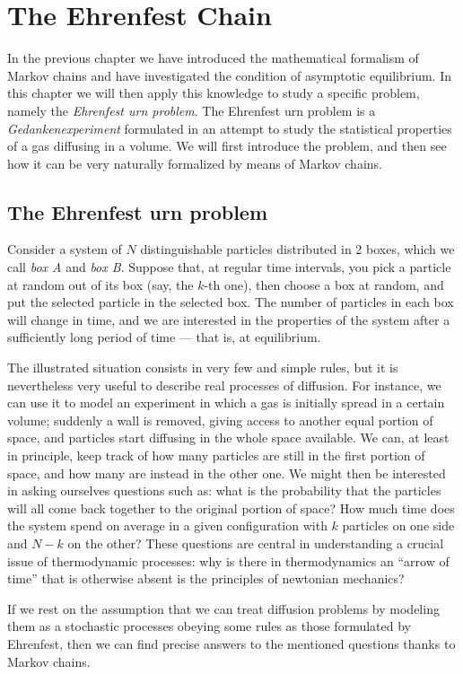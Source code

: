 \chapter{The Ehrenfest Chain}
In the previous chapter we have introduced the mathematical formalism of Markov chains and have investigated the condition of asymptotic equilibrium. In this chapter we will then apply this knowledge to study a specific problem, namely the \emph{Ehrenfest urn problem}. The Ehrenfest urn problem is a \emph{Gedankenexperiment} formulated in an attempt to study the statistical properties of a gas diffusing in a volume. We will first introduce the problem, and then see how it can be very naturally formalized by means of Markov chains.

\section{The Ehrenfest urn problem}
Consider a system of $N$ distinguishable particles distributed in 2 boxes, which we call \emph{box A} and \emph{box B}. Suppose that, at regular time intervals, you pick a particle at random out of its box (say, the $k$-th one), then choose a box at random, and put the selected particle in the selected box. The number of particles in each box will change in time, and we are interested in the properties of the system after a sufficiently long period of time --- that is, at equilibrium.

The illustrated situation consists in very few and simple rules, but it is nevertheless very useful to describe real processes of diffusion. For instance, we can use it to model an experiment in which a gas is initially spread in a certain volume; suddenly a wall is removed, giving access to another equal portion of space, and particles start diffusing in the whole space available. We can, at least in principle, keep track of how many particles are still in the first portion of space, and how many are instead in the other one. We might then be interested in asking ourselves questions such as: what is the probability that the particles will all come back together to the original portion of space? How much time does the system spend on average in a given configuration with $k$ particles on one side and $N - k$ on the other? These questions are central in understanding a crucial issue of thermodynamic processes: why is there in thermodynamics an \enquote{arrow of time} that is otherwise absent is the principles of newtonian mechanics?

If we rest on the assumption that we can treat diffusion problems by modeling them as a stochastic processes obeying some rules as those formulated by Ehrenfest, then we can find precise answers to the mentioned questions thanks to Markov chains.

